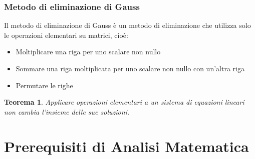 \documentclass[12pt]{article}
\newtheorem{Teorema}{Teorema}[subsection]
\begin{document}
\subsubsection{Metodo di eliminazione di Gauss}
Il metodo di eliminazione di Gauss è un metodo di eliminazione che utilizza solo le operazioni elementari su matrici, cioè:
\begin{itemize}
    \item Moltiplicare una riga per uno scalare non nullo
    \item Sommare una riga moltiplicata per uno scalare non nullo con un'altra riga
    \item Permutare le righe 
\end{itemize}
\begin{Teorema}
    Applicare operazioni elementari a un sistema di equazioni lineari non cambia l'insieme delle sue soluzioni.
\end{Teorema}
\section{Prerequisiti di Analisi Matematica}
\end{document}
